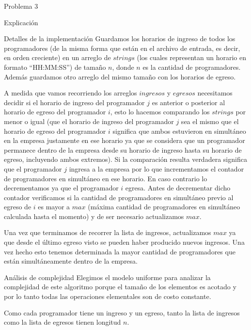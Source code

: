 \begin{section}{Problema 3}
\begin{subsection}{Explicación}
	\end{subsection}

	\begin{subsection}{Detalles de la implementación}
	Guardamos los horarios de ingreso de todos los programadores (de la misma forma que están en el archivo de entrada, es decir, en orden creciente) en un arreglo de $strings$ (los cuales representan un horario en formato ``HH:MM:SS'') de tamaño $n$, donde $n$ es la cantidad de programadores. Además guardamos otro arreglo del mismo tamaño con los horarios de egreso.
	
	A medida que vamos recorriendo los arreglos $ingresos$ y $egresos$ necesitamos decidir si el horario de ingreso del programador $j$ es anterior o posterior al horario de egreso del programador $i$, esto lo hacemos comparando los $strings$ por menor o igual (que el horario de ingreso del programador $j$ sea el mismo que el horario de egreso del programador $i$ significa que ambos estuvieron en simultáneo en la empresa justamente en ese horario ya que se considera que un programador permanece dentro de la empresa desde su horario de ingreso hasta su horario de egreso, incluyendo ambos extremos). Si la comparación resulta verdadera significa que el programador $j$ ingresa a la empresa por lo que incrementamos el contador de programadores en simultáneo en ese horario. En caso contrario lo decrementamos ya que el programador $i$ egresa. Antes de decrementar dicho contador verificamos si la cantidad de programadores en simultáneo previo al egreso de $i$ es mayor a $max$ (máxima cantidad de programadores en simultáneo calculada hasta el momento) y de ser necesario actualizamos $max$.

	Una vez que terminamos de recorrer la lista de ingresos, actualizamos $max$ ya que desde el último egreso visto se pueden haber producido nuevos ingresos. Una vez hecho esto tenemos determinada la mayor cantidad de programadores que están simultáneamente dentro de la empresa.
	\end{subsection}

	\begin{subsection}{Análisis de complejidad}
			Elegimos el modelo uniforme para analizar la complejidad de este algoritmo porque el tamaño de los elementos es acotado y por lo tanto todas las operaciones elementales son de costo constante.\Pa
			
			Como cada programador tiene un ingreso y un egreso, tanto la lista de ingresos como la lista de egresos tienen longitud $n$.


\end{subsection}
\end{section}
